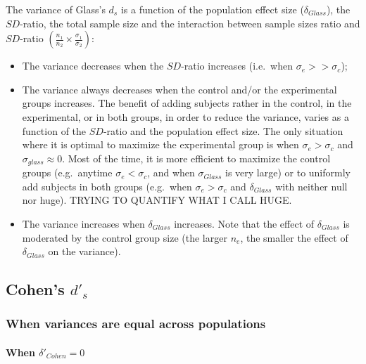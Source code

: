 \documentclass[
  man]{apa6}
\providecommand{\tightlist}{%
  \setlength{\itemsep}{0pt}\setlength{\parskip}{0pt}}
\begin{document}
The variance of Glass's \(d_s\) is a function of the population effect size (\(\delta_{Glass}\)), the \(SD\)-ratio, the total sample size and the interaction between sample sizes ratio and \(SD\)-ratio \(\left(\frac{n_1}{n_2}\times\frac{\sigma_1}{\sigma_2} \right)\):

\begin{itemize}
\tightlist
\item
  The variance decreases when the \(SD\)-ratio increases (i.e.~when \(\sigma_e >> \sigma_c\));\\
\item
  The variance always decreases when the control and/or the experimental groups increases. The benefit of adding subjects rather in the control, in the experimental, or in both groups, in order to reduce the variance, varies as a function of the \(SD\)-ratio and the population effect size. The only situation where it is optimal to maximize the experimental group is when \(\sigma_e > \sigma_c\) and \(\sigma_{glass} \approx 0\). Most of the time, it is more efficient to maximize the control groups (e.g.~anytime \(\sigma_e < \sigma_c\), and when \(\sigma_{Glass}\) is very large) or to uniformly add subjects in both groups (e.g.~when \(\sigma_e > \sigma_c\) and \(\delta_{Glass}\) with neither null nor huge). TRYING TO QUANTIFY WHAT I CALL HUGE.\\
\item
  The variance increases when \(\delta_{Glass}\) increases. Note that the effect of \(\delta_{Glass}\) is moderated by the control group size (the larger \(n_e\), the smaller the effect of \(\delta_{Glass}\) on the variance).
\end{itemize}

\hypertarget{cohens-d_s-1}{%
\subsection{\texorpdfstring{Cohen's \(d'_s\)}{Cohen's d'\_s}}\label{cohens-d_s-1}}

\hypertarget{when-variances-are-equal-across-populations-2}{%
\subsubsection{When variances are equal across populations}\label{when-variances-are-equal-across-populations-2}}

\hypertarget{when-delta_cohen0-1}{%
\paragraph{\texorpdfstring{When \(\delta'_{Cohen}=0\)}{When \textbackslash delta'\_\{Cohen\}=0}}\label{when-delta_cohen0-1}}
\end{document}
